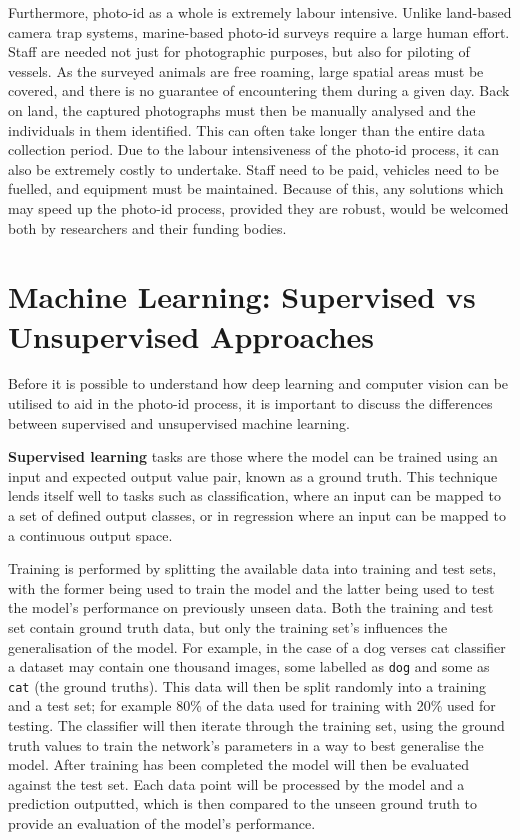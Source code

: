 Furthermore, photo-id as a whole is extremely labour intensive. Unlike land-based camera trap systems, marine-based photo-id surveys require a large human effort. Staff are needed not just for photographic purposes, but also for piloting of vessels. As the surveyed animals are free roaming, large spatial areas must be covered, and there is no guarantee of encountering them during a given day. Back on land, the captured photographs must then be manually analysed and the individuals in them identified. This can often take longer than the entire data collection period. Due to the labour intensiveness of the photo-id process, it can also be extremely costly to undertake. Staff need to be paid, vehicles need to be fuelled, and equipment must be maintained. Because of this, any solutions which may speed up the photo-id process, provided they are robust, would be welcomed both by researchers and their funding bodies. 

\section{Machine Learning: Supervised vs Unsupervised Approaches}\label{ch:Background,sec:DLIntro,sub:supervisedVsUnsupervisedLearning}

Before it is possible to understand how deep learning and computer vision can be utilised to aid in the photo-id process, it is important to discuss the differences between supervised and unsupervised machine learning.

\textbf{Supervised learning} tasks are those where the model can be trained using an input and expected output value pair, known as a ground truth. This technique lends itself well to tasks such as classification, where an input can be mapped to a set of defined output classes, or in regression where an input can be mapped to a continuous output space. 

Training is performed by splitting the available data into training and test sets, with the former being used to train the model and the latter being used to test the model's performance on previously unseen data. Both the training and test set contain ground truth data, but only the training set's influences the generalisation of the model. For example, in the case of a dog verses cat classifier a dataset may contain one thousand images, some labelled as \texttt{dog} and some as \texttt{cat} (the ground truths). This data will then be split randomly into a training and a test set; for example 80\% of the data used for training with 20\% used for testing. The classifier will then iterate through the training set, using the ground truth values to train the network's parameters in a way to best generalise the model. After training has been completed the model will then be evaluated against the test set. Each data point will be processed by the model and a prediction outputted, which is then compared to the unseen ground truth to provide an evaluation of the model's performance.

